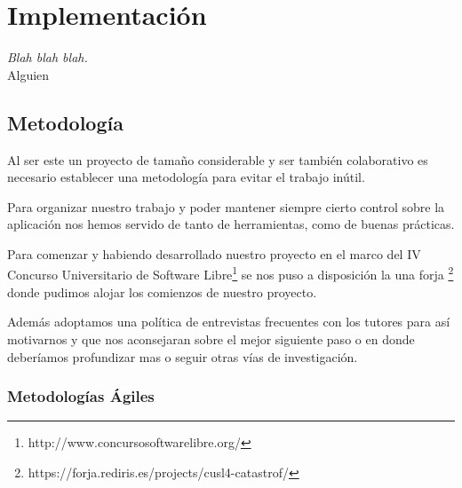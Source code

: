 
\chapter*{Implementación} \label{cap5}


\begin{flushright}
\begin{minipage}{7.85cm}
    {\em Blah blah blah.} \\  Alguien
\end{minipage}
\end{flushright}

\vspace*{5mm}

\section*{Metodología}
Al ser este un proyecto de tamaño considerable y ser también colaborativo es
necesario establecer una metodología para evitar el trabajo inútil.

Para organizar nuestro trabajo y poder mantener siempre cierto control sobre la
aplicación nos hemos servido de tanto de herramientas, como de buenas prácticas.

Para comenzar y habiendo desarrollado nuestro proyecto en el marco del IV
Concurso Universitario de Software
Libre\footnote{http://www.concursosoftwarelibre.org/} se nos puso a disposición
la una forja
\footnote{https://forja.rediris.es/projects/cusl4-catastrof/} donde pudimos
alojar los comienzos de nuestro proyecto.

Además adoptamos una política de entrevistas frecuentes con los tutores para
así motivarnos y que nos aconsejaran sobre el mejor siguiente paso o en donde
deberíamos profundizar mas o seguir otras vías de investigación.

\subsection*{Metodologías Ágiles}

